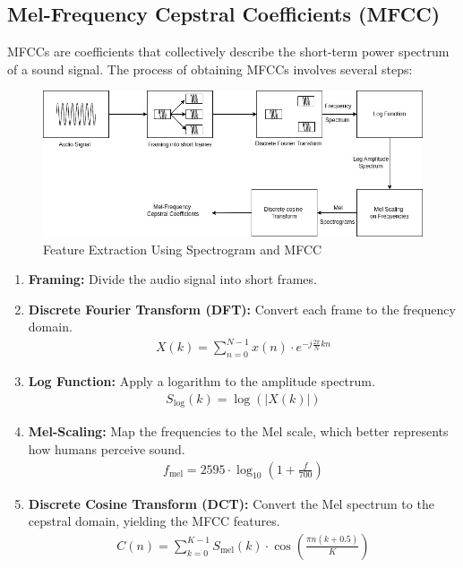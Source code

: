       \newpage
      
      \subsection{Mel-Frequency Cepstral Coefficients (MFCC)}
      MFCCs are coefficients that collectively describe the short-term power spectrum
      of a sound signal. The process of obtaining MFCCs involves several steps:
      \begin{figure}[h!]
            \centering
            \includegraphics[scale=0.5]{images/MFCC.jpg}
            \caption{Feature Extraction Using Spectrogram and
                  MFCC}%
      \end{figure}
      
      \begin{enumerate}
            \item \textbf{Framing:} Divide the audio signal into short frames.
            \item \textbf{Discrete Fourier Transform (DFT):} Convert each frame to the
                  frequency domain.
                  \begin{eqnarray}
                        X(k) = \sum_{n=0}^{N-1} x(n) \cdot e^{-j \frac{2\pi}{N} kn}
                  \end{eqnarray}

            \item \textbf{Log Function:} Apply a logarithm to the amplitude spectrum.
                  \begin{eqnarray}
                        S_{\text{log}}(k) = \log(|X(k)|)
                  \end{eqnarray}

            \item \textbf{Mel-Scaling:} Map the frequencies to the Mel scale, which
                  better represents how humans perceive sound.
                  \begin{eqnarray}
                        f_{\text{mel}} = 2595 \cdot \log_{10}(1 + \frac{f}{700})
                  \end{eqnarray}

            \item \textbf{Discrete Cosine Transform (DCT):} Convert the Mel spectrum to
                  the cepstral domain, yielding the MFCC features.
                  \begin{eqnarray}
                        C(n) = \sum_{k=0}^{K-1} S_{\text{mel}}(k) \cdot \cos \left(
                        \frac{\pi n (k+0.5)}{K} \right)
                  \end{eqnarray}

      \end{enumerate}

